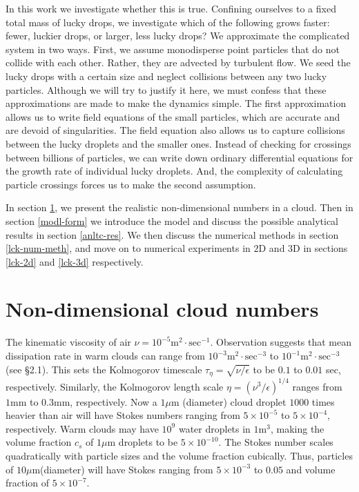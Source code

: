 \documentclass[../Rajarshi-thesis-draft.tex]{subfiles}
\begin{document}
In this work we investigate whether this is true. Confining ourselves to a fixed total mass of lucky drops, we investigate which of the following grows faster: fewer, luckier drops, or larger, less lucky drops? We approximate the complicated system in two ways. First, we assume monodisperse point particles that do not collide with each other. Rather, they are advected by turbulent flow. We seed the lucky drops with a certain size and neglect collisions between any two lucky particles. Although we will try to justify it here, we must confess that these approximations are made to make the dynamics simple. The first approximation allows us to write field equations of the small particles, which are accurate and are devoid of singularities. The field equation also allows us to capture collisions between the lucky droplets and the smaller ones. Instead of checking for crossings between billions of particles, we can write down ordinary differential equations for the growth rate of individual lucky droplets. And, the complexity of calculating particle crossings forces us to make the second assumption.

In section \ref{ndim-cl}, we present the realistic non-dimensional numbers in a cloud. Then in section \ref{modl-form} we introduce the model and discuss the possible analytical results in section \ref{anltc-res}. We then discuss the numerical methods in section \ref{lck-num-meth}, and move on to numerical experiments in $2$D and $3$D in sections \ref{lck-2d} and \ref{lck-3d} respectively.


\section{Non-dimensional cloud numbers}\label{ndim-cl}
The kinematic viscosity of air $\nu = 10^{-5}\mbox{m}^2\cdot\mbox{sec}^{-1}$. Observation suggests that mean dissipation rate in warm clouds can range from $10^{-3}\mbox{m}^2\cdot\mbox{sec}^{-3}$ to $10^{-1}\mbox{m}^2\cdot\mbox{sec}^{-3}$ (see \citet{grabowski2013} \S 2.1). This sets the Kolmogorov timescale $\tau_\eta = \sqrt{\nu/\epsilon}$ to be $0.1$ to $0.01$ sec, respectively. Similarly, the Kolmogorov length scale $\eta = (\nu^3/\epsilon)^{1/4}$ ranges from $1\mbox{mm}$ to $0.3\mbox{mm}$, respectively. Now a $1\mu\mbox{m}$ (diameter) cloud droplet $1000$ times heavier than air will have Stokes numbers ranging from $5\times 10^{-5}$ to $5\times 10^{-4}$, respectively. Warm clouds may have $10^{9}$ water droplets in $1\mbox{m}^3$, making the volume fraction $c_s$ of $1\mu\mbox{m}$ droplets to be $5\times 10^{-10}$. The Stokes number scales quadratically with particle sizes and the volume fraction cubically. Thus, particles of $10\mu\mbox{m}$(diameter) will have Stokes ranging from $5\times 10^{-3}$ to $0.05$ and volume fraction of $5\times 10^{-7}$.
\end{document}
